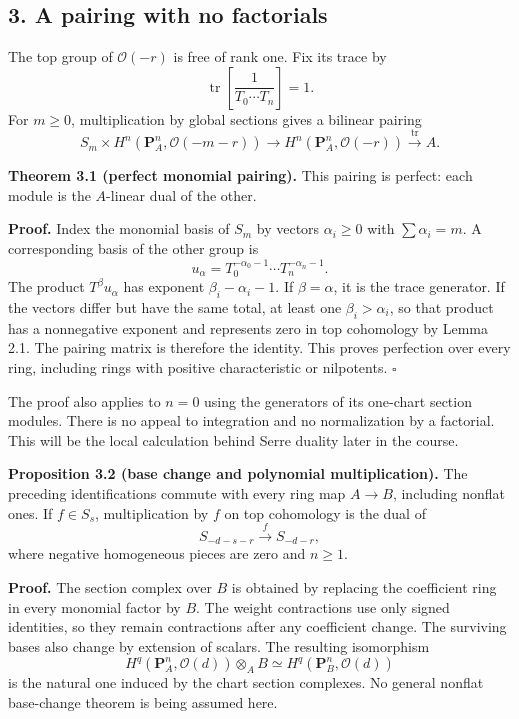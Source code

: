 \documentclass[11pt]{article}
\begin{document}
\subsection{3. A pairing with no
factorials}\label{a-pairing-with-no-factorials}

The top group of \(\mathcal O(-r)\) is free of rank one. Fix its trace
by \[
\operatorname{tr}\left[\frac1{T_0\cdots T_n}\right]=1.
\] For \(m\ge0\), multiplication by global sections gives a bilinear
pairing \[
S_m\times H^n(\mathbf P_A^n,\mathcal O(-m-r))
\longrightarrow H^n(\mathbf P_A^n,\mathcal O(-r))
\xrightarrow{\operatorname{tr}}A.
\]

\textbf{Theorem 3.1 (perfect monomial pairing).} This pairing is
perfect: each module is the \(A\)-linear dual of the other.

\textbf{Proof.} Index the monomial basis of \(S_m\) by vectors
\(\alpha_i\ge0\) with \(\sum\alpha_i=m\). A corresponding basis of the
other group is \[
u_\alpha=T_0^{-\alpha_0-1}\cdots T_n^{-\alpha_n-1}.
\] The product \(T^\beta u_\alpha\) has exponent \(\beta_i-\alpha_i-1\).
If \(\beta=\alpha\), it is the trace generator. If the vectors differ
but have the same total, at least one \(\beta_i>\alpha_i\), so that
product has a nonnegative exponent and represents zero in top cohomology
by Lemma 2.1. The pairing matrix is therefore the identity. This proves
perfection over every ring, including rings with positive characteristic
or nilpotents. \(\square\)

The proof also applies to \(n=0\) using the generators of its one-chart
section modules. There is no appeal to integration and no normalization
by a factorial. This will be the local calculation behind Serre duality
later in the course.

\textbf{Proposition 3.2 (base change and polynomial multiplication).}
The preceding identifications commute with every ring map \(A\to B\),
including nonflat ones. If \(f\in S_s\), multiplication by \(f\) on top
cohomology is the dual of \[
S_{-d-s-r}\xrightarrow{\ f\ }S_{-d-r},
\] where negative homogeneous pieces are zero and \(n\ge1\).

\textbf{Proof.} The section complex over \(B\) is obtained by replacing
the coefficient ring in every monomial factor by \(B\). The weight
contractions use only signed identities, so they remain contractions
after any coefficient change. The surviving bases also change by
extension of scalars. The resulting isomorphism \[
H^q(\mathbf P_A^n,\mathcal O(d))\otimes_A B
\simeq H^q(\mathbf P_B^n,\mathcal O(d))
\] is the natural one induced by the chart section complexes. No general
nonflat base-change theorem is being assumed here.
\end{document}
